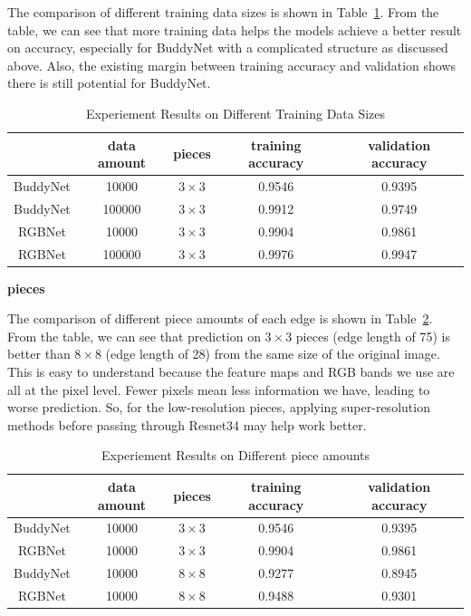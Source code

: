 \documentclass{article}
\begin{document}
The comparison of different training data sizes is shown in Table~\ref{tab:expamount}. From the table, we can see that more training data helps the models achieve a better result on accuracy, especially for BuddyNet with a complicated structure as discussed above. Also, the existing margin between training accuracy and validation shows there is still potential for BuddyNet.

\begin{table}
    \caption{Experiement Results on Different Training Data Sizes}
    \centering
    \label{tab:expamount}
    \begin{tabular}{c|c|c|c|c}
        \hline
        & data amount & pieces & training accuracy & validation accuracy\\
        \hline
        BuddyNet & 10000 & $3\times 3$ & 0.9546 & 0.9395\\
        \hline
        BuddyNet & 100000 & $3\times 3$ & 0.9912 & 0.9749\\
        \hline
        RGBNet & 10000 & $3\times 3$ & 0.9904 & 0.9861\\
        \hline
        RGBNet & 100000 & $3\times 3$ & 0.9976 & 0.9947\\
        \hline
    \end{tabular}
\end{table}

\textbf{pieces}

The comparison of different piece amounts of each edge is shown in Table~\ref{tab:exppiece}. From the table, we can see that prediction on $3\times 3$ pieces (edge length of 75) is better than $8\times 8$ (edge length of 28) from the same size of the original image. This is easy to understand because the feature maps and RGB bands we use are all at the pixel level. Fewer pixels mean less information we have, leading to worse prediction. So, for the low-resolution pieces, applying super-resolution methods before passing through Resnet34 may help work better.

\begin{table}
    \caption{Experiement Results on Different piece amounts}
    \centering
    \label{tab:exppiece}
    \begin{tabular}{c|c|c|c|c}
        \hline
        & data amount & pieces & training accuracy & validation accuracy\\
        \hline
        BuddyNet & 10000 & $3\times 3$ & 0.9546 & 0.9395\\
        \hline
        RGBNet & 10000 & $3\times 3$ & 0.9904 & 0.9861\\
        \hline
        BuddyNet & 10000 & $8\times 8$ & 0.9277 & 0.8945\\
        \hline
        RGBNet & 10000 & $8\times 8$ & 0.9488 & 0.9301\\
        \hline
    \end{tabular}
\end{table}
\end{document}
